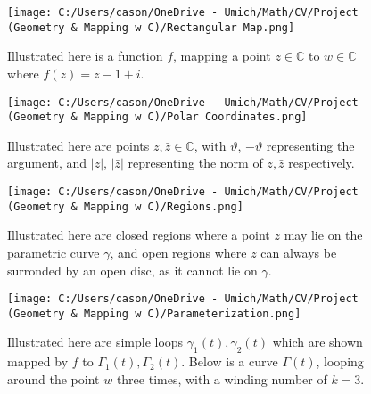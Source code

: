 \documentclass[a4paper,man,natbib]{apa6}
\newcommand{\C}{\mathbb{C}}  %
\begin{document}

\begin{figure}

      \centering
      \texttt{[image: C:/Users/cason/OneDrive - Umich/Math/CV/Project (Geometry \& Mapping w C)/Rectangular Map.png]}
      \caption{\label{C:/Users/cason/OneDrive - Umich/Math/CV/Project (Geometry & Mapping w C)/Rectangular Map.png}
      Illustrated here is a function $ f $, mapping a point $ z \in \C $ to $ w \in \C $ where $ f(z) = z -1 +i $.}

\end{figure}

\begin{figure}


      \centering
      \texttt{[image: C:/Users/cason/OneDrive - Umich/Math/CV/Project (Geometry \& Mapping w C)/Polar Coordinates.png]}
      \caption{\label{C:/Users/cason/OneDrive - Umich/Math/CV/Project (Geometry & Mapping w C)/Polar Coordinates.png}
      Illustrated here are points $ z, \bar{z} \in \C $, with $ \vartheta $, $ -\vartheta $  representing the argument, and $ |z| $, $ |\bar{z}| $ representing the norm of $ z, \bar{z} $ respectively.}

\end{figure}

\begin{figure}

      \centering
      \texttt{[image: C:/Users/cason/OneDrive - Umich/Math/CV/Project (Geometry \& Mapping w C)/Regions.png]}
      \caption{\label{C:/Users/cason/OneDrive - Umich/Math/CV/Project (Geometry & Mapping w C)/Regions.png}
      Illustrated here are closed regions where a point $ z $ may lie on the parametric curve $ \gamma $, 
      and open regions where $ z $ can always be surronded by an open disc, as it cannot lie on $ \gamma $.}

\end{figure}

\begin{figure}

      \centering
      \texttt{[image: C:/Users/cason/OneDrive - Umich/Math/CV/Project (Geometry \& Mapping w C)/Parameterization.png]}
      \caption{\label{C:/Users/cason/OneDrive - Umich/Math/CV/Project (Geometry & Mapping w C)/Parameterization.png}
      Illustrated here are simple loops  $ \gamma_{1}(t),\gamma_{2}(t) $ which are shown mapped by $ f $ to $ \Gamma_{1}(t),\Gamma_{2}(t) $. Below is a curve $ \Gamma(t) $, 
	looping around the point $ w $ three times, with a winding number of $ k = 3 $.}

\end{figure}
\end{document}
